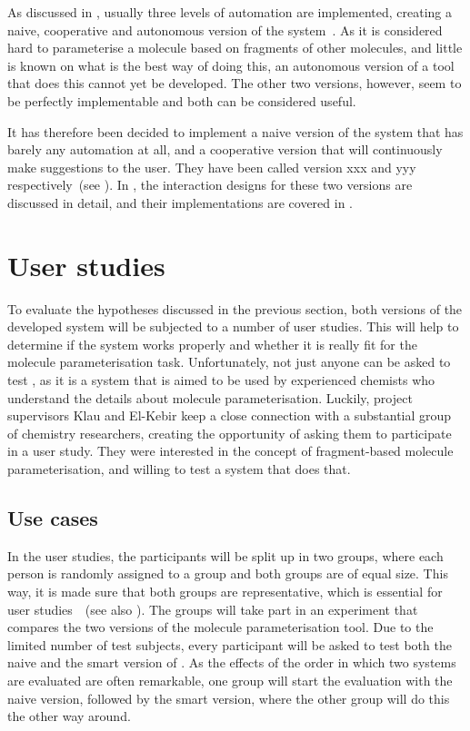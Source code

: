 As discussed in , usually three levels of automation are implemented, creating a naive, cooperative and autonomous version of the system~\cite{payne2000varying}. As it is considered hard to parameterise a molecule based on fragments of other molecules, and little is known on what is the best way of doing this, an autonomous version of a tool that does this cannot yet be developed. The other two versions, however, seem to be perfectly implementable and both can be considered useful.

It has therefore been decided to implement a naive version of the system that has barely any automation at all, and a cooperative version that will continuously make suggestions to the user. They have been called version xxx and yyy respectively~(see ). In , the interaction designs for these two versions are discussed in detail, and their implementations are covered in .



\section{User studies}
To evaluate the hypotheses discussed in the previous section, both versions of the developed system will be subjected to a number of user studies. This will help to determine if the system works properly and whether it is really fit for the molecule parameterisation task. Unfortunately, not just anyone can be asked to test \oframp, as it is a system that is aimed to be used by experienced chemists who understand the details about molecule parameterisation. Luckily, project supervisors Klau and El-Kebir keep a close connection with a substantial group of chemistry researchers, creating the opportunity of asking them to participate in a user study. They were interested in the concept of fragment-based molecule parameterisation, and willing to test a system that does that.


\subsection{Use cases}
In the user studies, the participants will be split up in two groups, where each person is randomly assigned to a group and both groups are of equal size. This way, it is made sure that both groups are representative, which is essential for user studies~\cite{wohlin2003empirical}~(see also ). The groups will take part in an experiment that compares the two versions of the molecule parameterisation tool. Due to the limited number of test subjects, every participant will be asked to test both the naive and the smart version of \oframp. As the effects of the order in which two systems are evaluated are often remarkable, one group will start the evaluation with the naive version, followed by the smart version, where the other group will do this the other way around.

